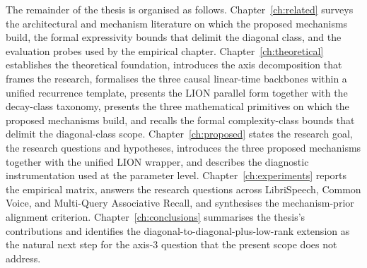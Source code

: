 The remainder of the thesis is organised as follows.
Chapter~\ref{ch:related} surveys the architectural and mechanism
literature on which the proposed mechanisms build, the formal
expressivity bounds that delimit the diagonal class, and the
evaluation probes used by the empirical chapter.
Chapter~\ref{ch:theoretical} establishes the theoretical
foundation, introduces the axis decomposition that frames the
research, formalises the three causal linear-time backbones
within a unified recurrence template, presents the LION parallel
form together with the decay-class taxonomy, presents the three
mathematical primitives on which the proposed mechanisms build,
and recalls the formal complexity-class bounds that delimit the
diagonal-class scope.
Chapter~\ref{ch:proposed} states the research goal, the research
questions and hypotheses, introduces the three proposed
mechanisms together with the unified LION wrapper, and describes
the diagnostic instrumentation used at the parameter level.
Chapter~\ref{ch:experiments} reports the empirical matrix, answers
the research questions across LibriSpeech, Common Voice, and
Multi-Query Associative Recall, and synthesises the
mechanism-prior alignment criterion.
Chapter~\ref{ch:conclusions} summarises the thesis's contributions
and identifies the diagonal-to-diagonal-plus-low-rank extension as
the natural next step for the axis-3 question that the present scope
does not address.
